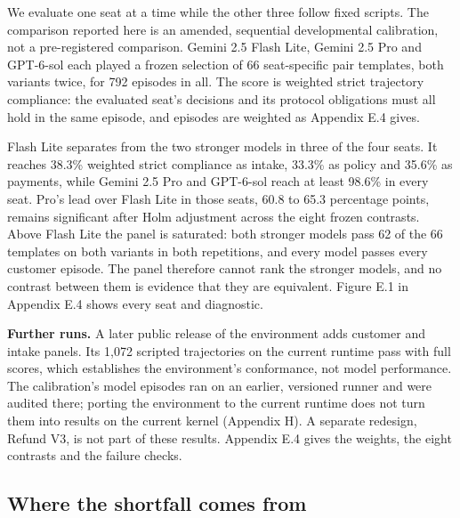 We evaluate one seat at a time while the other three follow fixed scripts. The comparison reported here is an
amended, sequential developmental calibration, not a pre-registered comparison. Gemini 2.5 Flash Lite, Gemini 2.5
Pro and GPT-6-sol each played a frozen selection of 66 seat-specific pair templates, both variants twice, for 792
episodes in all. The score is weighted strict trajectory compliance: the evaluated seat's decisions and its
protocol obligations must all hold in the same episode, and episodes are weighted as Appendix E.4 gives.

Flash Lite separates from the two stronger models in three of the four seats. It reaches 38.3\% weighted strict compliance
as intake, 33.3\% as policy and 35.6\% as payments, while Gemini 2.5 Pro and GPT-6-sol reach at least 98.6\% in every
seat. Pro's lead over Flash Lite in those seats, 60.8 to 65.3 percentage points, remains significant after Holm
adjustment across the eight frozen contrasts. Above Flash Lite the panel is saturated: both stronger models pass 62
of the 66 templates on both variants in both repetitions, and every model passes every customer episode. The panel
therefore cannot rank the stronger models, and no contrast between them is evidence that they are equivalent.
Figure E.1 in Appendix E.4 shows every seat and diagnostic.

\textbf{Further runs.} A later public release of the environment adds customer and intake panels. Its 1,072 scripted
trajectories on the current runtime pass with full scores, which establishes the environment's conformance, not model
performance. The calibration's model episodes ran on an earlier, versioned runner and were audited there; porting the
environment to the current runtime does not turn them into results on the current kernel (Appendix H). A separate
redesign, Refund V3, is not part of these results. Appendix E.4 gives the weights, the eight contrasts and the
failure checks.

\subsection{Where the shortfall comes from}\label{where-the-shortfall-comes-from}

